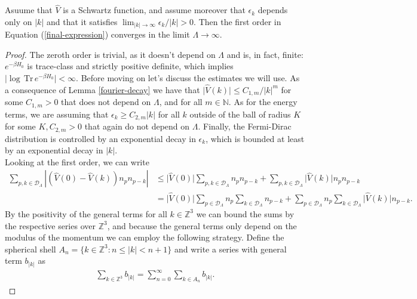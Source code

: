 \begin{theorem}
	\label{removing-cutoff}
	Asuume that $\hat{V}$ is a Schwartz function, and assume moreover that $\epsilon_k$
	depends only on $\vert k\vert$ and that it satisfies
	$\lim_{\vert k\vert\to\infty}\epsilon_k/\vert k\vert>0$. Then the first order in Equation
	(\ref{final-expression}) converges in the limit $\Lambda\to\infty$.
\end{theorem}
\begin{proof}
	The zeroth order is trivial, as it doesn't depend on $\Lambda$ and is, in fact, finite:
	$e^{-\beta H_0}$ is trace-class and strictly positive definite, which implies
	$\vert\log\,\mathrm{Tr}\,e^{-\beta H_0}\vert<\infty$. Before moving on let's discuss the
	estimates we will use. As a consequence of Lemma \ref{fourier-decay} we have that $\vert
	\hat{V}(k)\vert\leq C_{1,m}/\vert k\vert^m$ for some $C_{1,m}>0$ that does not depend on
	$\Lambda$, and for all $m\in\mathbb{N}$. As for the energy terms, we are assuming that
	$\epsilon_k\geq C_{2,m}\vert k\vert$ for all $k$ outside of the ball of radius
	$K$ for some $K,C_{2,m}>0$ that again do not depend on $\Lambda$. Finally, the Fermi-Dirac
	distribution is controlled by an exponential decay in $\epsilon_k$, which is bounded at
	least by an exponential decay in $\vert k\vert$.
	\\
	Looking at the first order, we can write
	\begin{align*}
		\sum_{p,k\in\mathcal{D}_\Lambda} \left\vert\left(\hat{V}(0)-\hat{V}(k)\right) n_p n_{p-k}\right\vert
		&\leq \vert\hat{V}(0)\vert \sum_{p,k\in\mathcal{D}_\Lambda}n_p n_{p-k}
		+ \sum_{p,k\in\mathcal{D}_\Lambda}\vert\hat{V}(k)\vert n_p n_{p-k}\\
		&= \vert\hat{V}(0)\vert \sum_{p\in\mathcal{D}_\Lambda}n_p\sum_{k\in\mathcal{D}_\Lambda}n_{p-k}
		+ \sum_{p\in\mathcal{D}_\Lambda}n_p\sum_{k\in\mathcal{D}_\Lambda}\vert\hat{V}(k)\vert n_{p-k}.
	\end{align*}
	By the positivity of the general terms for all $k\in\mathbb{Z}^3$ we can bound the sums by
	the respective series over $\mathbb{Z}^3$, and because the general terms only depend on
	the modulus of the momentum we can employ the following strategy. Define the spherical
	shell $A_n = \{k\in\mathbb{Z}^3 : n \leq \vert k\vert < n+1\}$ and write a series with
	general term $b_{\vert k\vert}$ as
	\begin{align*}
		\sum_{k\in\mathbb{Z}^3} b_{\vert k\vert} = \sum_{n=0}^\infty \sum_{k\in A_n} b_{\vert k\vert}.
	\end{align*}

\end{proof}
